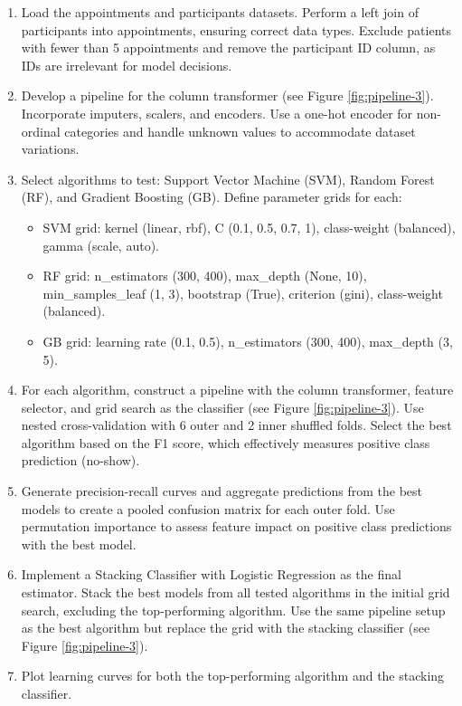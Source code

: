 \documentclass[a4paper,12pt]{article}
\begin{document}
\begin{enumerate}
\item Load the appointments and participants datasets. Perform a left join of participants into appointments, ensuring correct data types. Exclude patients with fewer than 5 appointments and remove the participant ID column, as IDs are irrelevant for model decisions.
\item Develop a pipeline for the column transformer (see Figure \ref{fig:pipeline-3}). Incorporate imputers, scalers, and encoders. Use a one-hot encoder for non-ordinal categories and handle unknown values to accommodate dataset variations.
\item Select algorithms to test: Support Vector Machine (SVM), Random Forest (RF), and Gradient Boosting (GB). Define parameter grids for each:
 \begin{itemize}
    \item SVM grid: kernel (linear, rbf), C (0.1, 0.5, 0.7, 1), class-weight (balanced), gamma (scale, auto).
    \item RF grid: n\_estimators (300, 400), max\_depth (None, 10), min\_samples\_leaf (1, 3), bootstrap (True), criterion (gini), class-weight (balanced).
    \item GB grid: learning rate (0.1, 0.5), n\_estimators (300, 400), max\_depth (3, 5).
    \end{itemize}
\item For each algorithm, construct a pipeline with the column transformer, feature selector, and grid search as the classifier (see Figure \ref{fig:pipeline-3}). Use nested cross-validation with 6 outer and 2 inner shuffled folds. Select the best algorithm based on the F1 score, which effectively measures positive class prediction (no-show).
\item Generate precision-recall curves and aggregate predictions from the best models to create a pooled confusion matrix for each outer fold. Use permutation importance to assess feature impact on positive class predictions with the best model.
\item Implement a Stacking Classifier with Logistic Regression as the final estimator. Stack the best models from all tested algorithms in the initial grid search, excluding the top-performing algorithm. Use the same pipeline setup as the best algorithm but replace the grid with the stacking classifier (see Figure \ref{fig:pipeline-3}).
\item Plot learning curves for both the top-performing algorithm and the stacking classifier.
\end{enumerate}
\end{document}
